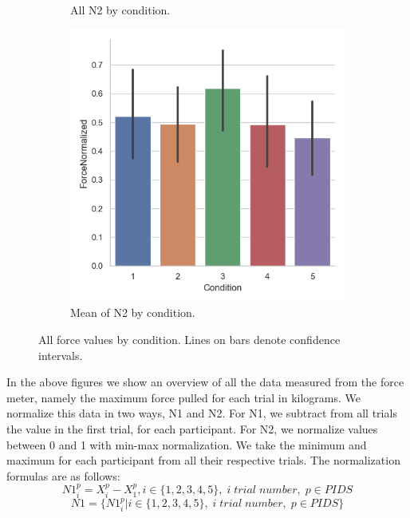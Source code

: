 \begin{figure}[H]
\begin{subfigure}[b]{0.4\textwidth}
         \caption{All N2 by condition.}
         \label{fig:allN2Norm}
     \end{subfigure}
\hspace*{\fill}
     \begin{subfigure}[b]{0.4\textwidth}
         \centering
         \includegraphics[width=\textwidth]{Files/Plots/forceNormalized_mean_by_condition.png}
         \caption{Mean of N2 by condition.}
         \label{fig:meanN2Cond}
     \end{subfigure} 
      \caption{All force values by condition. Lines on bars denote confidence intervals.}
         \label{fig:allForceCond}
\end{figure} 
\clearpage
In the above figures we show an overview of all the data measured from the force meter, namely the maximum force pulled for each trial in kilograms. We normalize this data in two ways, N1 and N2. For N1, we subtract from all trials the value in the first trial, for each participant. For N2, we normalize values between 0 and 1 with min-max normalization. We take the minimum and maximum for each participant from all their respective trials. The normalization formulas are as follows: 
\[ N1_i^p=X_i^p-X_1^p, i \in \{1,2,3,4,5\},\; i \; trial \; number,\; p \in PIDS \]
\[N1= \{ N1_i^p |  i \in \{1,2,3,4,5\},\; i \; trial \; number,\; p \in PIDS \}  \]

